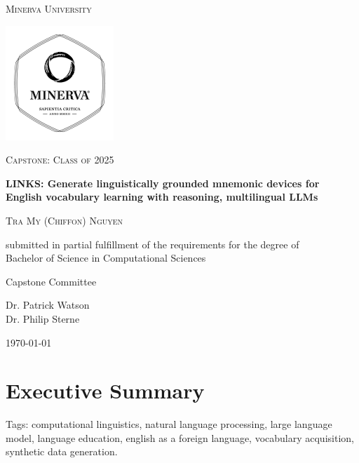 
\begin{titlepage}
\centering
{\scshape\LARGE Minerva University \par}
\vspace{1cm}
\begin{center}
  \includegraphics[width=0.4\linewidth]{preamble/minerva_logo.pdf}
\end{center}
{\scshape\Large Capstone: Class of 2025 \par}
\vspace{1.5cm}
{\huge\bfseries LINKS: Generate linguistically grounded mnemonic devices for English vocabulary learning with reasoning, multilingual LLMs \par}
\vspace{2cm}
{\scshape\large Tra My (Chiffon) Nguyen \par}

\vfill
submitted in partial fulfillment of the requirements for the degree of \\ Bachelor of Science in Computational Sciences \par
\vspace{2cm}
{\large Capstone Committee \par}
Dr. Patrick Watson \\
Dr. Philip Sterne \\
\vspace{2cm}
{\large \today\par}
\end{titlepage}

\onecolumn
\section*{Executive Summary}

Tags: computational linguistics, natural language processing, large language model, language education, english as a foreign language, vocabulary acquisition, synthetic data generation.

